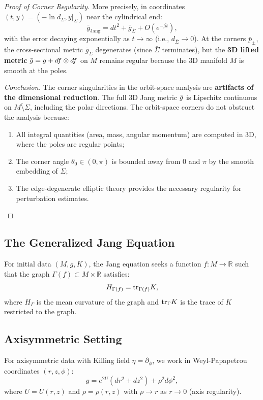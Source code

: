 \begin{remark}
\begin{proof}[Proof of Corner Regularity]
More precisely, in coordinates $(t, y) = (-\ln d_{\bar{\Sigma}}, y|_{\bar{\Sigma}})$ near the cylindrical end:
\[
\bar{g}_{\text{Jang}} = dt^2 + \bar{g}_{\bar{\Sigma}} + O(e^{-\beta t}),
\]
with the error decaying exponentially as $t \to \infty$ (i.e., $d_{\bar{\Sigma}} \to 0$). At the corners $\bar{p}_\pm$, the cross-sectional metric $\bar{g}_{\bar{\Sigma}}$ degenerates (since $\bar{\Sigma}$ terminates), but the \textbf{3D lifted metric} $\bar{g} = g + df \otimes df$ on $M$ remains regular because the 3D manifold $M$ is smooth at the poles.

\textit{Conclusion.} The corner singularities in the orbit-space analysis are \textbf{artifacts of the dimensional reduction}. The full 3D Jang metric $\bar{g}$ is Lipschitz continuous on $\overline{M \setminus \Sigma}$, including the polar directions. The orbit-space corners do not obstruct the analysis because:
\begin{enumerate}
    \item All integral quantities (area, mass, angular momentum) are computed in 3D, where the poles are regular points;
    \item The corner angle $\theta_0 \in (0, \pi)$ is bounded away from $0$ and $\pi$ by the smooth embedding of $\Sigma$;
    \item The edge-degenerate elliptic theory provides the necessary regularity for perturbation estimates.
\end{enumerate}
\end{proof}
\end{remark}

\subsection{The Generalized Jang Equation}

For initial data $(M, g, K)$, the Jang equation seeks a function $f: M \to \mathbb{R}$ such that the graph $\Gamma(f) \subset M \times \mathbb{R}$ satisfies:
\begin{equation}\label{eq:jang}
H_{\Gamma(f)} = \mathrm{tr}_{\Gamma(f)} K,
\end{equation}
where $H_\Gamma$ is the mean curvature of the graph and $\mathrm{tr}_\Gamma K$ is the trace of $K$ restricted to the graph.

\subsection{Axisymmetric Setting}

For axisymmetric data with Killing field $\eta = \partial_\phi$, we work in Weyl-Papapetrou coordinates $(r, z, \phi)$:
\begin{equation}
g = e^{2U}(dr^2 + dz^2) + \rho^2 d\phi^2,
\end{equation}
where $U = U(r, z)$ and $\rho = \rho(r, z)$ with $\rho \to r$ as $r \to 0$ (axis regularity).

